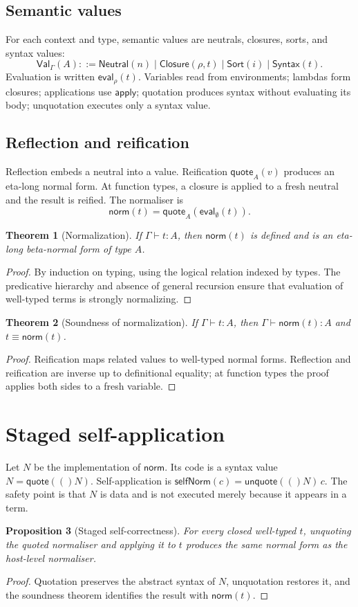 \documentclass[11pt,a4paper]{article}
\newtheorem{theorem}{Theorem}[section]
\newtheorem{proposition}[theorem]{Proposition}
\renewcommand{\quote}[1]{\mathsf{quote}(#1)}
\newcommand{\unquote}[1]{\mathsf{unquote}(#1)}
\begin{document}
\subsection{Semantic values}
For each context and type, semantic values are neutrals, closures, sorts, and syntax values:
\[
\mathsf{Val}_\Gamma(A)::=\mathsf{Neutral}(n)\mid\mathsf{Closure}(\rho,t)\mid\mathsf{Sort}(i)\mid\mathsf{Syntax}(t).
\]
Evaluation is written $\mathsf{eval}_\rho(t)$. Variables read from environments; lambdas form closures; applications use $\mathsf{apply}$; quotation produces syntax without evaluating its body; unquotation executes only a syntax value.

\subsection{Reflection and reification}
Reflection embeds a neutral into a value. Reification $\mathsf{quote}_A(v)$ produces an eta-long normal form. At function types, a closure is applied to a fresh neutral and the result is reified. The normaliser is
\[
\mathsf{norm}(t)=\mathsf{quote}_A(\mathsf{eval}_{\emptyset}(t)).
\]
\begin{theorem}[Normalization]
If $\Gamma\vdash t:A$, then $\mathsf{norm}(t)$ is defined and is an eta-long beta-normal form of type $A$.
\end{theorem}
\begin{proof}
By induction on typing, using the logical relation indexed by types. The predicative hierarchy and absence of general recursion ensure that evaluation of well-typed terms is strongly normalizing.
\end{proof}
\begin{theorem}[Soundness of normalization]
If $\Gamma\vdash t:A$, then $\Gamma\vdash\mathsf{norm}(t):A$ and $t\equiv\mathsf{norm}(t)$.
\end{theorem}
\begin{proof}
Reification maps related values to well-typed normal forms. Reflection and reification are inverse up to definitional equality; at function types the proof applies both sides to a fresh variable.
\end{proof}

\section{Staged self-application}
Let $N$ be the implementation of $\mathsf{norm}$. Its code is a syntax value $N=\quote(N)$. Self-application is $\mathsf{selfNorm}(c)=\unquote(N)\,c$. The safety point is that $N$ is data and is not executed merely because it appears in a term.
\begin{proposition}[Staged self-correctness]
For every closed well-typed $t$, unquoting the quoted normaliser and applying it to $t$ produces the same normal form as the host-level normaliser.
\end{proposition}
\begin{proof}
Quotation preserves the abstract syntax of $N$, unquotation restores it, and the soundness theorem identifies the result with $\mathsf{norm}(t)$.
\end{proof}
\end{document}
